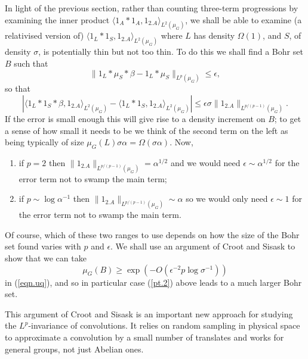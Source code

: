 \documentclass[12pt]{amsart}  %
\begin{document}
In light of the previous section, rather than counting three-term progressions by examining the inner product $\langle 1_A \ast 1_A,1_{2.A}\rangle_{L^2(\mu_G)}$, we shall be able to examine (a relativised version of) $\langle 1_L \ast 1_S,1_{2.A}\rangle_{L^2(\mu_G)}$ where $L$ has density $\Omega(1)$, and $S$, of density $\sigma$, is potentially thin but not too thin.  To do this we shall find a Bohr set $B$ such that
\begin{equation}\label{eqn.uq}
 \|1_L \ast \mu_S \ast \beta - 1_L \ast \mu_S\|_{L^p(\mu_G)} \leq \epsilon,
\end{equation}
so that
\begin{equation*}
|\langle 1_L \ast 1_S \ast \beta,1_{2.A} \rangle_{L^2(\mu_G)} - \langle 1_L\ast 1_S,1_{2.A}\rangle_{L^2(\mu_G)}| \leq \epsilon \sigma \|1_{2.A}\|_{L^{p/(p-1)}(\mu_G)}.
\end{equation*}
If the error is small enough this will give rise to a density increment on $B$; to get a sense of how small it needs to be we think of the second term on the left as being typically of size $\mu_G(L)\sigma\alpha=\Omega(\sigma\alpha)$.  Now,
\begin{enumerate}
\item \label{pt.1} if $p=2$ then $\|1_{2.A}\|_{L^{p/(p-1)}(\mu_G)}= \alpha^{1/2}$ and we would need $\epsilon \sim \alpha^{1/2}$ for the error term not to swamp the main term;
\item \label{pt.2} if $p \sim \log \alpha^{-1}$ then $\|1_{2.A}\|_{L^{p/(p-1)}(\mu_G)} \sim \alpha$ so we would only need $\epsilon \sim 1$ for the error term not to swamp the main term.
\end{enumerate}
Of course, which of these two ranges to use depends on how the size of the Bohr set found varies with $p$ and $\epsilon$.  We shall use an argument of Croot and Sisask \cite{crosis::} to show that we can take
\begin{equation}\label{eqn.bq}
\mu_G(B) \geq \exp(-O(\epsilon^{-2}p\log \sigma^{-1}))
\end{equation}
in (\ref{eqn.uq}), and so in particular case (\ref{pt.2}) above leads to a much larger Bohr set.

This argument of Croot and Sisask is an important new approach for studying the $L^p$-invariance of convolutions.  It relies on random sampling in physical space to approximate a convolution by a small number of translates and works for general groups, not just Abelian ones.
\end{document}
